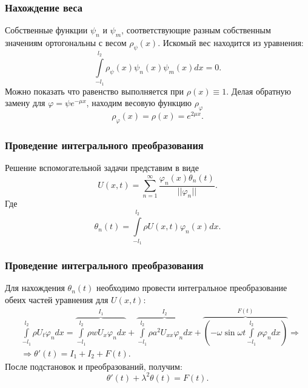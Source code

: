 \documentclass[10pt,pdf,hyperref={unicode}]{beamer}
\begin{document}
\begin{frame}
  \frametitle{Нахождение веса}
  Собственные функции $\psi_n$ и $\psi_m$, соответствующие разным собственным значениям ортогональны с весом $\rho_\psi(x)$. Искомый вес находится из уравнения:
  \begin{equation*}
    \int \limits_{-l_1}^{l_2} \rho_\psi(x) \psi_n(x) \psi_m(x) dx = 0.
  \end{equation*}
  Можно показать что равенство выполняется при $\rho(x) \equiv 1$.
  Делая обратную замену для $\varphi = \psi e^{-\mu x}$, находим весовую функцию $\rho_\varphi$
  \begin{equation*}
    \rho_\varphi(x) = \rho(x) = e^{2 \mu x}.
  \end{equation*}
\end{frame}

\begin{frame}
  \frametitle{Проведение интегрального преобразования}
  Решение вспомогательной задачи представим в виде
  \begin{equation*}
    U(x,t)=\sum \limits_{n=1}^{\infty} \frac{\varphi_n(x) \theta_n(t)}{||\varphi_n||}.
  \end{equation*}
  Где
  \begin{equation*}
    \theta_n(t) = \int \limits_{-l_1}^{l_2} \rho U(x,t) \varphi_n(x) dx.
  \end{equation*}
\end{frame}

\begin{frame}
  \frametitle{Проведение интегрального преобразования}
  Для нахождения $\theta_n(t)$ необходимо провести интегральное преобразование обеих частей уравнения для $U(x,t)$:
  \begin{equation*}
    \begin{aligned}
      & \int \limits_{-l_1}^{l_2} \rho U_t \varphi_n dx = \overbrace{\int \limits_{-l_1}^{l_2} \rho w U_x \varphi_n dx}^{I_1} + \overbrace{\int \limits_{-l_1}^{l_2} \rho a^2 U_{xx} \varphi_n dx}^{I_2} +  \overbrace{\left( -\omega \sin \omega t \int \limits_{-l_1}^{l_2} \rho \varphi_n dx \right)}^{F(t)}  \Rightarrow \\
    & \Rightarrow \theta'(t) = I_1 + I_2 + F(t).
  \end{aligned}
  \end{equation*}
  После подстановок и преобразований, получим:
  \begin{equation*}
  \theta'(t) + \lambda^2 \theta(t) = F(t).
  \end{equation*}

\end{frame}
\end{document}
